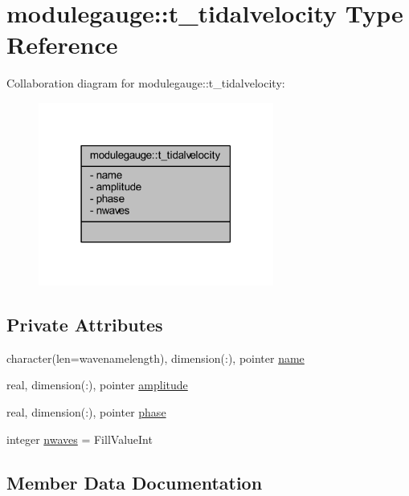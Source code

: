 \hypertarget{structmodulegauge_1_1t__tidalvelocity}{}\section{modulegauge\+:\+:t\+\_\+tidalvelocity Type Reference}
\label{structmodulegauge_1_1t__tidalvelocity}


Collaboration diagram for modulegauge\+:\+:t\+\_\+tidalvelocity\+:\nopagebreak
\begin{figure}[H]
\begin{center}
\leavevmode
\includegraphics[width=219pt]{structmodulegauge_1_1t__tidalvelocity__coll__graph}
\end{center}
\end{figure}
\subsection*{Private Attributes}
\begin{DoxyCompactItemize}
\item 
character(len=wavenamelength), dimension(\+:), pointer \mbox{\hyperlink{structmodulegauge_1_1t__tidalvelocity_a76fc7e543c9f2c5bd303b8862ea225c4}{name}}
\item 
real, dimension(\+:), pointer \mbox{\hyperlink{structmodulegauge_1_1t__tidalvelocity_afe0cd518c9f77b69d97e4b283fcc6f31}{amplitude}}
\item 
real, dimension(\+:), pointer \mbox{\hyperlink{structmodulegauge_1_1t__tidalvelocity_aa682bbb3b22a65fdc5a176428e1d9c97}{phase}}
\item 
integer \mbox{\hyperlink{structmodulegauge_1_1t__tidalvelocity_a5b441c1397e7ad8043d9f2b8dd391987}{nwaves}} = Fill\+Value\+Int
\end{DoxyCompactItemize}


\subsection{Member Data Documentation}
\mbox{\label{structmodulegauge_1_1t__tidalvelocity_afe0cd518c9f77b69d97e4b283fcc6f31}} 
